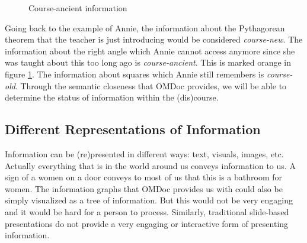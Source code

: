 \documentclass[twoside, 12pt]{article}
\begin{document}
\begin{figure}
\vspace{-26pt}
  \begin{center}
  \end{center}
\vspace{-20pt}
  \caption{Course-ancient information}
  \label{fig:Annie-ancient}
\vspace{-10pt}
\end{figure}

Going back to the example of Annie, the information about the Pythagorean theorem that the teacher is just introducing would be considered \textit{course-new}. The information about the right angle which Annie cannot access anymore since she was taught about this too long ago is \textit{course-ancient}. This is marked orange in figure \ref{fig:Annie-ancient}. The information about squares which Annie still remembers is \textit{course-old}. Through the semantic closeness that OMDoc provides, we will be able to determine the status of information within the (dis)course. \\

\subsection{Different Representations of Information}
\label{sec:inforep}

Information can be (re)presented in different ways: text, visuals, images, etc. Actually everything that is in the world around us conveys information to us. A sign of a women on a door conveys to most of us that this is a bathroom for women. The information graphs that OMDoc provides us with could also be simply visualized as a tree of information. But this would not be very engaging and it would be hard for a person to process. Similarly, traditional slide-based presentations do not provide a very engaging or interactive form of presenting information. \\  
\end{document}
